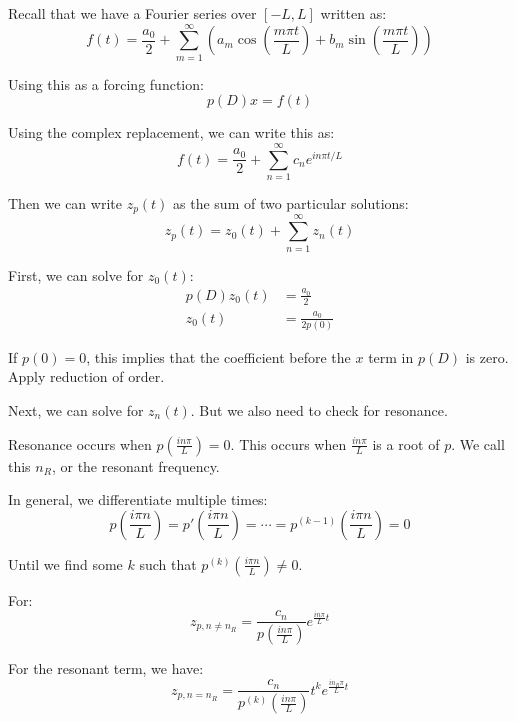 Recall that we have a Fourier series over $[-L, L]$ written as:
\begin{equation*}
f(t) = \frac{a_0}{2} + \sum_{m=1}^{\infty} \left( a_m \cos\left( \frac{m \pi t}{L} \right) + b_m \sin\left( \frac{m \pi t}{L} \right) \right)
\end{equation*}

Using this as a forcing function:
\begin{equation*}
p(D) x = f(t)
\end{equation*}

Using the complex replacement, we can write this as:
\begin{equation*}
f(t) = \frac{a_0}{2} + \sum_{n=1}^{\infty} c_n e^{i n \pi t / L}
\end{equation*}

Then we can write $z_p(t)$ as the sum of two particular solutions:
\begin{equation*}
z_p(t) = z_0(t) + \sum_{n=1}^{\infty} z_n(t)
\end{equation*}

First, we can solve for $z_0(t)$:
\begin{align*}
p(D) z_0(t) &= \frac{a_0}{2} \\
z_0(t) &= \frac{a_0}{2 p(0)}
\end{align*}

If $p(0) = 0$, this implies that the coefficient before the $x$ term in $p(D)$ is zero. Apply reduction of order.

Next, we can solve for $z_n(t)$. But we also need to check for resonance.

Resonance occurs when $p(\frac{i n \pi}{L}) = 0$. This occurs when $\frac{i n \pi}{L}$ is a root of $p$. We call this $n_R$, or the resonant frequency.

In general, we differentiate multiple times:
\begin{equation*}
p(\frac{i \pi n}{L}) = p'(\frac{i \pi n}{L}) = \cdots = p^{(k-1)}(\frac{i \pi n}{L}) = 0
\end{equation*}

Until we find some $k$ such that $p^{(k)}(\frac{i \pi n}{L}) \neq 0$. 

For:
\begin{equation*}
\boxed{
z_{p, n \not = n_R} = \frac{c_n}{p(\frac{i n \pi}{L})} e^{\frac{i n \pi}{L} t}
}
\end{equation*}


For the resonant term, we have:
\begin{equation*}
\boxed{
z_{p, n = n_R} = \frac{c_n}{p^{(k)}(\frac{i n \pi}{L})} t^k e^{\frac{i n_R \pi}{L}t}
}
\end{equation*}


